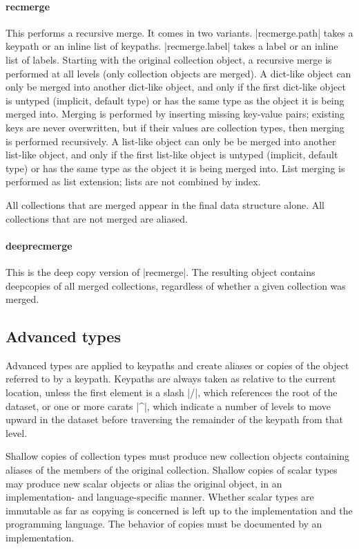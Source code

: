 \documentclass[11pt]{article}
\begin{document}
{{\paragraph{recmerge}

This performs a recursive merge.  It comes in two variants. |recmerge.path| takes a keypath or an inline list of keypaths.  |recmerge.label| takes a label or an inline list of labels.  Starting with the original collection object, a recursive merge is performed at all levels (only collection objects are merged).  A dict-like object can only be merged into another dict-like object, and only if the first dict-like object is untyped (implicit, default type) or has the same type as the object it is being merged into.  Merging is performed by inserting missing key-value pairs; existing keys are never overwritten, but if their values are collection types, then merging is performed recursively.  A list-like object can only be be merged into another list-like object, and only if the first list-like object is untyped (implicit, default type) or has the same type as the object it is being merged into.  List merging is performed as list extension; lists are not combined by index.

All collections that are merged appear in the final data structure alone.  All collections that are not merged are aliased.


\paragraph{deeprecmerge}

This is the deep copy version of |recmerge|.  The resulting object contains deepcopies of all merged collections, regardless of whether a given collection was merged.



\subsection{Advanced types}
Advanced types are applied to keypaths and create aliases or copies of the object referred to by a keypath.  Keypaths are always taken as relative to the current location, unless the first element is a slash |/|, which references the root of the dataset, or one or more carats |^|, which indicate a number of levels to move upward in the dataset before traversing the remainder of the keypath from that level.

Shallow copies of collection types must produce new collection objects containing aliases of the members of the original collection.  Shallow copies of scalar types may produce new scalar objects or alias the original object, in an implementation- and language-specific manner.  Whether scalar types are immutable as far as copying is concerned is left up to the implementation and the programming language.  The behavior of copies must be documented by an implementation.

}}
\end{document}
